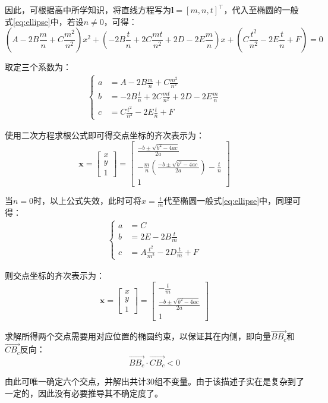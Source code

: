 \documentclass{article}
\begin{document}
因此，可根据高中所学知识，将直线方程写为$\mathbf{l}=[m,n,t]^\top$，代入至椭圆的一般式\ref{eq:ellipse}中，若设$n\neq 0$，可得：
\begin{equation}
  \left(A-2B\frac{m}{n}+C\frac{m^2}{n^2}\right)x^2+\left(-2B\frac{t}{n}+2C\frac{mt}{n^2}+2D-2E\frac{m}{n}\right)x+\left(C\frac{t^2}{n^2}-2E\frac{t}{n}+F\right)=0
  \label{eq:line}
\end{equation}\par
取定三个系数为：
\begin{align*}
  \left\{
    \begin{aligned}
      a &= A-2B\frac{m}{n}+C\frac{m^2}{n^2}\\
      b &= -2B\frac{t}{n}+2C\frac{mt}{n^2}+2D-2E\frac{m}{n}\\
      c &= C\frac{t^2}{n^2}-2E\frac{t}{n}+F
    \end{aligned}
  \right.
\end{align*}\par
使用二次方程求根公式即可得交点坐标的齐次表示为：
\begin{equation*}
  \mathbf{x}=\begin{bmatrix}
    x\\y\\1
  \end{bmatrix}=\begin{bmatrix}
    \frac{-b\pm\sqrt{b^2-4ac}}{2a}\\-\frac{m}{n}\left(\frac{-b\pm\sqrt{b^2-4ac}}{2a}\right)-\frac{t}{n}\\1
  \end{bmatrix}
\end{equation*}\par
当$n=0$时，以上公式失效，此时可将$x=\frac{t}{m}$代至椭圆一般式\ref{eq:ellipse}中，同理可得：
\begin{align*}
  \left\{
    \begin{aligned}
      a &= C\\
      b &= 2E-2B\frac{t}{m}\\
      c &= A\frac{t^2}{m^2}-2D\frac{t}{m}+F
    \end{aligned}
  \right.
\end{align*}\par
则交点坐标的齐次表示为：
\begin{equation*}
  \mathbf{x}=\begin{bmatrix}
    x\\y\\1
  \end{bmatrix}=\begin{bmatrix}
    -\frac{t}{m}\\\frac{-b\pm\sqrt{b^2-4ac}}{2a}\\1
  \end{bmatrix}
\end{equation*}\par
求解所得两个交点需要用对应位置的椭圆约束，以保证其在内侧，即向量$\overrightarrow{BB_c}$和$\overrightarrow{CB_c}$反向：
\begin{equation*}
  \overrightarrow{BB_c}\cdot\overrightarrow{CB_c}<0
\end{equation*}\par
由此可唯一确定六个交点，并解出共计30组不变量。由于该描述子实在是复杂到了一定的，因此没有必要推导其不确定度了。
\end{document}
